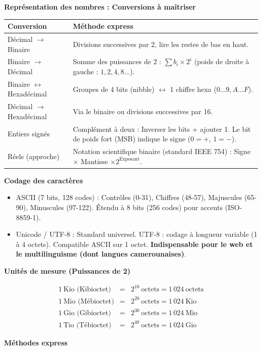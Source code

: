 \documentclass[11pt]{article}
\newcommand{\cle}[1]{{\popxbold\color{popdark}#1}}
\begin{document}
\begin{bilan}
\par\medskip\textbf{Représentation des nombres : Conversions à maîtriser}\par

\begin{center}
\begin{tabularx}{\linewidth}{|l|X|}
\hline
\rowcolor{popblueL}
\textbf{Conversion} & \textbf{Méthode express} \\
\hline
Décimal $\to$ Binaire & Divisions successives par 2, lire les restes de bas en haut. \\
\hline
Binaire $\to$ Décimal & Somme des puissances de 2 : $\sum b_i \times 2^i$ (poids de droite à gauche : $1, 2, 4, 8\dots$). \\
\hline
Binaire $\leftrightarrow$ Hexadécimal & Groupes de 4 bits (nibble) $\leftrightarrow$ 1 chiffre hexa ($0\dots9, A\dots F$). \\
\hline
Décimal $\to$ Hexadécimal & Via le binaire ou divisions successives par 16. \\
\hline
Entiers signés & \cle{Complément à deux} : Inverser les bits + ajouter 1. Le bit de poids fort (MSB) indique le signe ($0=+$, $1=-$). \\
\hline
Réels (approche) & Notation scientifique binaire (standard IEEE 754) : Signe $\times$ Mantisse $\times 2^{\text{Exposant}}$. \\
\hline
\end{tabularx}
\end{center}

\par\medskip\textbf{Codage des caractères}\par

\begin{itemize}
  \item \cle{ASCII} (7 bits, 128 codes) : Contrôles (0-31), Chiffres (48-57), Majuscules (65-90), Minuscules (97-122). Étendu à 8 bits (256 codes) pour accents (ISO-8859-1).
  \item \cle{Unicode / UTF-8} : Standard universel. UTF-8 : codage à longueur variable (1 à 4 octets). Compatible ASCII sur 1 octet. \textbf{Indispensable pour le web et le multilinguisme (dont langues camerounaises)}.
\end{itemize}

\par\medskip\textbf{Unités de mesure (Puissances de 2)}\par

\[
\begin{array}{rcl}
1\ \text{Kio (Kibioctet)} &=& 2^{10}\ \text{octets} = 1\,024\ \text{octets} \\
1\ \text{Mio (Mébioctet)} &=& 2^{20}\ \text{octets} = 1\,024\ \text{Kio} \\
1\ \text{Gio (Gibioctet)} &=& 2^{30}\ \text{octets} = 1\,024\ \text{Mio} \\
1\ \text{Tio (Tébioctet)} &=& 2^{40}\ \text{octets} = 1\,024\ \text{Gio}
\end{array}
\]


\par\medskip\textbf{Méthodes express}\par

\end{bilan}
\end{document}
